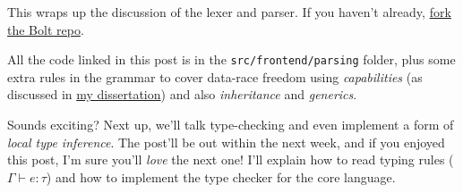 This wraps up the discussion of the lexer and parser. If you haven't
already, \href{https://github.com/mukul-rathi/bolt}{fork the Bolt repo}.

All the code linked in this post is in the \texttt{src/frontend/parsing}
folder, plus some extra rules in the grammar to cover data-race freedom
using \emph{capabilities} (as discussed in
\href{https://github.com/mukul-rathi/bolt-dissertation}{my
dissertation}) and also \emph{inheritance} and \emph{generics}.

Sounds exciting? Next up, we'll talk type-checking and even implement a
form of \emph{local type inference}. The post'll be out within the next
week, and if you enjoyed this post, I'm sure you'll \emph{love} the next
one! I'll explain how to read typing rules
({{{\(\Gamma \vdash e:\tau\)}}})
and how to implement the type checker for the core language.

